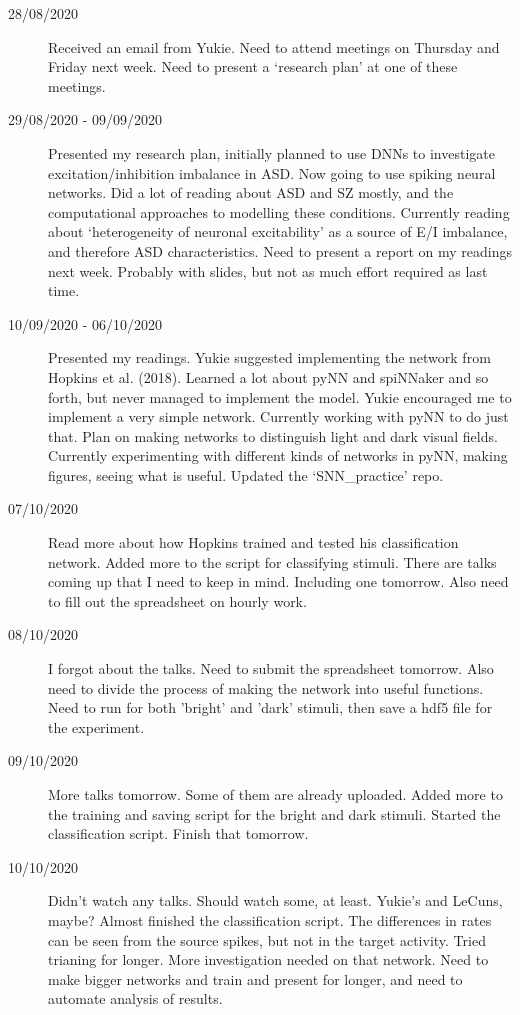 \documentclass[a4paper,12pt]{article}
\theoremstyle{definition}
\begin{document}
\begin{description}
	\item[28/08/2020] Received an email from Yukie. Need to attend meetings on Thursday and Friday next week. Need to present a `research plan' at one of these meetings.

	\item[29/08/2020 - 09/09/2020] Presented my research plan, initially planned to use DNNs to investigate excitation/inhibition imbalance in ASD. Now going to use spiking neural networks. Did a lot of reading about ASD and SZ mostly, and the computational approaches to modelling these conditions. Currently reading about `heterogeneity of neuronal excitability' as a source of E/I imbalance, and therefore ASD characteristics. Need to present a report on my readings next week. Probably with slides, but not as much effort required as last time.

	\item[10/09/2020 - 06/10/2020] Presented my readings. Yukie suggested implementing the network from Hopkins et al. (2018). Learned a lot about pyNN and spiNNaker and so forth, but never managed to implement the model. Yukie encouraged me to implement a very simple network. Currently working with pyNN to do just that. Plan on making networks to distinguish light and dark visual fields. Currently experimenting with different kinds of networks in pyNN, making figures, seeing what is useful. Updated the `SNN\_practice' repo.

	\item[07/10/2020] Read more about how Hopkins trained and tested his classification network. Added more to the script for classifying stimuli. There are talks coming up that I need to keep in mind. Including one tomorrow. Also need to fill out the spreadsheet on hourly work.

	\item[08/10/2020] I forgot about the talks. Need to submit the spreadsheet tomorrow. Also need to divide the process of making the network into useful functions. Need to run for both 'bright' and 'dark' stimuli, then save a hdf5 file for the experiment.

	\item[09/10/2020] More talks tomorrow. Some of them are already uploaded. Added more to the training and saving script for the bright and dark stimuli. Started the classification script. Finish that tomorrow.

	\item[10/10/2020] Didn't watch any talks. Should watch some, at least. Yukie's and LeCuns, maybe? Almost finished the classification script. The differences in rates can be seen from the source spikes, but not in the target activity. Tried trianing for longer. More investigation needed on that network. Need to make bigger networks and train and present for longer, and need to automate analysis of results.


\end{description}
\end{document}
